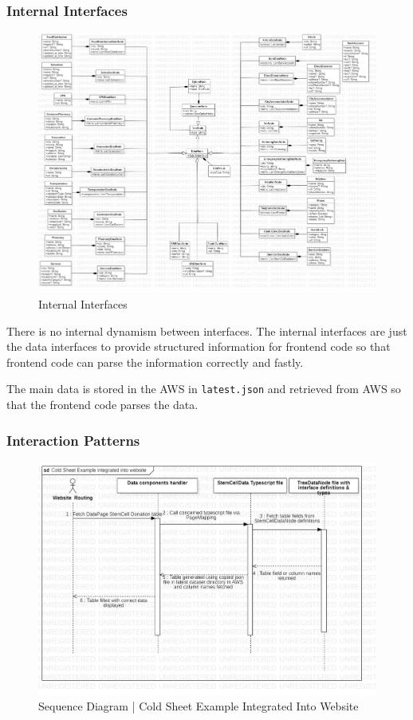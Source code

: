 \subsubsection{Internal Interfaces}

\begin{figure}[H]
  \centering
  \includegraphics[width=\linewidth]{img/internal-interfaces-diagram.jpg}
  \caption{Internal Interfaces}
\end{figure}

There is no internal dynamism between interfaces. The internal interfaces are just the data interfaces to provide structured information for frontend code so that frontend code can parse the information correctly and fastly.

The main data is stored in the AWS in \texttt{latest.json} and retrieved from AWS so that the frontend code parses the data.

\subsubsection{Interaction Patterns}

\begin{figure}[H]
  \centering
  \includegraphics[width=\linewidth]{img/sequence-diagram-1.jpg}
  \caption{Sequence Diagram | Cold Sheet Example Integrated Into Website}
\end{figure}

